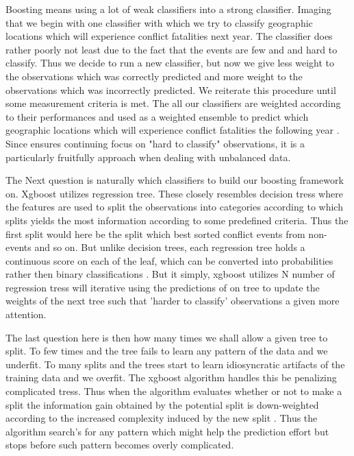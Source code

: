 \documentclass[a4paper]{article}
\begin{document}
Boosting means using a lot of weak classifiers into a strong classifier. Imaging that we begin with one classifier with which we try to classify geographic locations which will experience conflict fatalities next year. The classifier does rather poorly not least due to the fact that the events are few and and hard to classify. Thus we decide to run a new classifier, but now we give less weight to the observations which was correctly predicted and more weight to the observations which was incorrectly predicted. We reiterate this procedure until some measurement criteria is met. The all our classifiers are weighted according to their performances and used as a weighted ensemble to predict which geographic locations which will experience conflict fatalities the following year \citep[338-339]{Friedman_2001}. Since ensures continuing focus on "hard to classify" observations, it is a particularly fruitfully approach when dealing with unbalanced data.\par

The Next question is naturally which classifiers to build our boosting framework on. Xgboost utilizes regression tree. These closely resembles decision tress where the features are used to split the observations into categories according to which splits yields the most information according to some predefined criteria. Thus the first split would here be the split which best sorted conflict events from non-events and so on. But unlike decision trees, each regression tree holds a continuous score on each of the leaf, which can be converted into probabilities rather then binary classifications \citep[2]{Chen_2016}. But it simply, xgboost utilizes N number of regression tress will iterative using the predictions of on tree to update the weights of the next tree such that 'harder to classify' observations a given more attention.\par

The last question here is then how many times we shall allow a given tree to split. To few times and the tree fails to learn any pattern of the data and we underfit. To many splits and the trees start to learn idiosyncratic artifacts of the training data and we overfit. The xgboost algorithm handles this be penalizing complicated tress. Thus when the algorithm evaluates whether or not to make a split the information gain obtained by the potential split is down-weighted according to the increased complexity induced by the new split \cite[4-7]{Chen_2016}. Thus the algorithm search's for any pattern which might help the prediction effort but stops before such pattern becomes overly complicated.\par 
\end{document}
